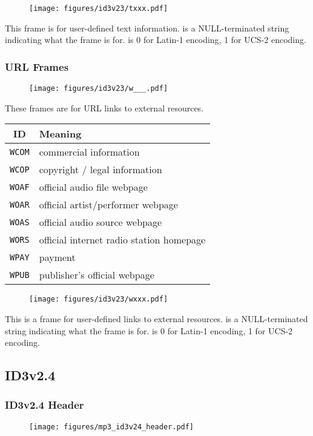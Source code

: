 \begin{figure}[h]
\texttt{[image: figures/id3v23/txxx.pdf]}
\end{figure}
This frame is for user-defined text information.
 is a NULL-terminated string indicating
what the frame is for.
 is 0 for Latin-1 encoding, 1 for UCS-2 encoding.

\clearpage

\subsubsection{URL Frames}
\begin{figure}[h]
\texttt{[image: figures/id3v23/w\_\_\_.pdf]}
\end{figure}
These frames are for URL links to external resources.
\par
\begin{table}[h]
\begin{tabular}{|c|l|}
\hline
ID & Meaning \\
\hline
\texttt{WCOM} & commercial information \\
\texttt{WCOP} & copyright / legal information \\
\texttt{WOAF} & official audio file webpage \\
\texttt{WOAR} & official artist/performer webpage \\
\texttt{WOAS} & official audio source webpage \\
\texttt{WORS} & official internet radio station homepage \\
\texttt{WPAY} & payment \\
\texttt{WPUB} & publisher's official webpage \\
\hline
\end{tabular}
\end{table}
\begin{figure}[h]
\texttt{[image: figures/id3v23/wxxx.pdf]}
\end{figure}
This is a frame for user-defined links to external resources.
 is a NULL-terminated string indicating
what the frame is for.
 is 0 for Latin-1 encoding, 1 for UCS-2 encoding.

\clearpage

\subsection{ID3v2.4}
\subsubsection{ID3v2.4 Header}
\begin{figure}[h]
\texttt{[image: figures/mp3\_id3v24\_header.pdf]}
\end{figure}

